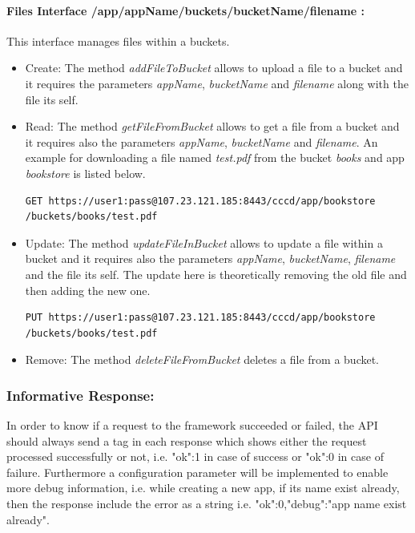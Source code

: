 \paragraph{Files Interface /app/{appName}/buckets/{bucketName}/{filename} :}  This interface manages files within a buckets.

\begin{itemize}
\item {Create:} The method \textit{addFileToBucket} allows to upload a file to a bucket and it requires the parameters \textit{appName}, \textit{bucketName} and \textit{filename} along with the file its self.

\item {Read:} The method \textit{getFileFromBucket} allows to get a file from a bucket and it requires also the parameters \textit{appName}, \textit{bucketName} and \textit{filename}.  An example for downloading a file named \textit{test.pdf} from the bucket \textit{books} and app \textit{bookstore} is listed below.

\begin{code}
\begin{verbatim}
GET https://user1:pass@107.23.121.185:8443/cccd/app/bookstore
/buckets/books/test.pdf
\end{verbatim}
\end{code}

\item {Update:} The method \textit{updateFileInBucket} allows to update a file within a bucket and it requires also the parameters \textit{appName}, \textit{bucketName}, \textit{filename} and the file its self.  The update here is theoretically removing the old file and then adding the new one.
\begin{code}
\begin{verbatim}
PUT https://user1:pass@107.23.121.185:8443/cccd/app/bookstore
/buckets/books/test.pdf
\end{verbatim}
\end{code}

\item {Remove:} The method \textit{deleteFileFromBucket} deletes a file from a bucket.

\end{itemize}





\subsubsection{Informative Response:} In order to know if a request to the framework succeeded or failed, the \ac{API} should always send a tag in each response which shows either the request processed successfully or not, i.e. {"ok":1} in case of success or {"ok":0} in case of failure. Furthermore a configuration parameter will be implemented to enable more debug information, i.e. while creating a new app, if its name exist already, then the response include the error as a string i.e. {"ok":0,"debug":"app name exist already"}.

